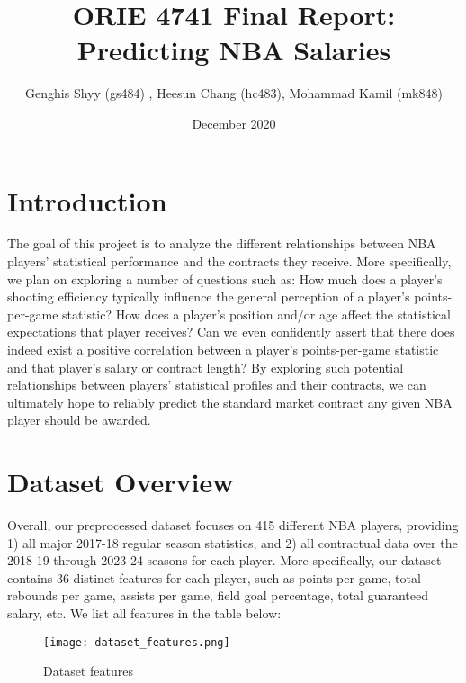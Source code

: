 \documentclass{article}
\title{ORIE 4741 Final Report: Predicting NBA Salaries}
\author{Genghis Shyy (gs484) , Heesun Chang (hc483), Mohammad Kamil (mk848) }
\date{December 2020}
\begin{document}
\maketitle

\section{Introduction}
The goal of this project is to analyze the different relationships between NBA players' statistical performance and the contracts they receive. More specifically, we plan on exploring a number of questions such as: How much does a player's shooting efficiency typically influence the general perception of a player's points-per-game statistic? How does a player's position and/or age affect the statistical expectations that player receives? Can we even confidently assert that there does indeed exist a positive correlation between a player's points-per-game statistic and that player's salary or contract length? By exploring such potential relationships between players' statistical profiles and their contracts, we can ultimately hope to reliably predict the standard market contract any given NBA player should be awarded.

\section{Dataset Overview}
Overall, our preprocessed dataset focuses on 415 different NBA players, providing 1) all major 2017-18 regular season statistics, and 2) all contractual data over the 2018-19 through 2023-24 seasons for each player. More specifically, our dataset contains 36 distinct features for each player, such as points per game, total rebounds per game, assists per game, field goal percentage, total guaranteed salary, etc. We list all features in the table below:

\begin{figure}[h]
    \centering
    \texttt{[image: dataset\_features.png]}
    \caption{Dataset features}
\end{figure}
\end{document}
